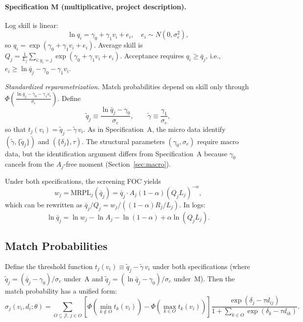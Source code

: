 \documentclass[11pt]{article}
\begin{document}
\paragraph{Specification M (multiplicative, project description).} Log skill is linear:
\[
\ln q_i = \gamma_0 + \gamma_1 v_i + e_i, \quad e_i\sim N(0,\sigma_e^2),
\]
so $q_i = \exp(\gamma_0 + \gamma_1 v_i + e_i)$. Average skill is $Q_j = \frac{1}{L_j}\sum_{i:y_i=j}\exp(\gamma_0 + \gamma_1 v_i + e_i)$. Acceptance requires $q_i \geq \bar q_j$, i.e., $e_i\geq \ln\bar q_j - \gamma_0 - \gamma_1 v_i$.

\medskip\noindent\textit{Standardized reparametrization.} Match probabilities depend on skill only through $\Phi\!\left(\frac{\ln\bar q_j - \gamma_0 - \gamma_1 v_i}{\sigma_e}\right)$. Define
\[
\tilde q_j \equiv \frac{\ln\bar q_j - \gamma_0}{\sigma_e}, \qquad \tilde\gamma \equiv \frac{\gamma_1}{\sigma_e},
\]
so that $t_j(v_i) = \tilde q_j - \tilde\gamma\, v_i$. As in Specification~A, the micro data identify $(\tilde\gamma, \{\tilde q_j\})$ and $(\{\delta_j\},\tau)$. The structural parameters $(\gamma_0,\sigma_e)$ require macro data, but the identification argument differs from Specification~A because $\gamma_0$ cancels from the $A_j$-free moment (Section~\ref{sec:macro}).

\medskip
\noindent Under both specifications, the screening FOC yields
\[
w_j = \text{MRPL}_j(\bar q_j) = \bar q_j \cdot A_j(1-\alpha)(Q_jL_j)^{-\alpha},
\]
which can be rewritten as $\bar q_j/Q_j = w_j / ((1-\alpha)R_j/L_j)$. In logs:
\begin{equation}\label{eq:screen_foc}
\ln \bar q_j = \ln w_j - \ln A_j - \ln(1-\alpha) + \alpha \ln(Q_jL_j).
\end{equation}

\subsection{Match Probabilities}

Define the threshold function $t_j(v_i) \equiv \tilde q_j - \tilde\gamma\, v_i$ under both specifications (where $\tilde q_j = (\bar q_j - \gamma_0)/\sigma_e$ under~A and $\tilde q_j = (\ln\bar q_j - \gamma_0)/\sigma_e$ under~M). Then the match probability has a unified form:
\begin{equation}\label{eq:sigma}
\sigma_j(v_i,d_i;\theta) = \sum_{O\subseteq \mathcal J,\, j\in O} \left[\Phi\!\left(\min_{k\notin O}t_k(v_i)\right) - \Phi\!\left(\max_{k\in O}t_k(v_i)\right)\right] \frac{\exp(\delta_j - \tau d_{ij})}{1+\sum_{k\in O}\exp(\delta_k - \tau d_{ik})}.
\end{equation}
\end{document}
